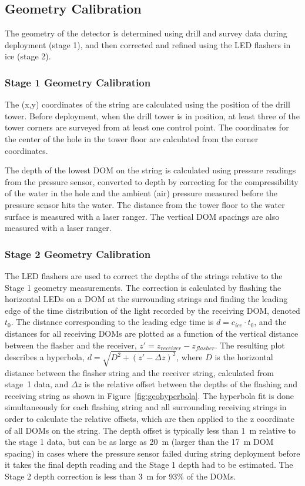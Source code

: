 \subsection{Geometry Calibration}

The geometry of the detector is determined using drill and survey data
during deployment (stage 1), and then corrected and refined using the LED
flashers in ice (stage 2).
\subsubsection{Stage 1 Geometry Calibration}
The (x,y) coordinates of the string are calculated using the position
of the drill tower. Before deployment, when the drill tower is in position, at least three
of the tower corners are surveyed from at least one control point.
The coordinates for the center of the hole in the tower floor are
calculated from the corner coordinates. 

The depth of the lowest DOM on the string is calculated using pressure
readings from the pressure sensor, converted to depth by correcting
for the compressibility of the water in the hole and the ambient (air)
pressure measured before the pressure sensor hits the water. The
distance from the tower floor to the water surface is measured with a
laser ranger. The vertical DOM spacings are also measured with a laser
ranger.

\subsubsection{Stage 2 Geometry Calibration}

The LED flashers are used to correct the depths of the
strings relative to the Stage 1 geometry measurements. The correction is
calculated by flashing the horizontal LEDs on a DOM at the surrounding strings and finding the leading edge of the time distribution of the
light recorded by the
receiving DOM, denoted $t_0$. The distance corresponding to the
leading edge time is $d = c_{ice} \cdot t_0$, and the distances for
all receiving DOMs are plotted as a function of the vertical distance
between the flasher and the receiver, $z' = z_{receiver} -
z_{flasher}$. The resulting plot describes a hyperbola, $d = \sqrt{D^2
+ (z' -\Delta z)^2}$, where $D$ is the horizontal distance between the
flasher string and the receiver string, calculated from stage~1 data,
and $\Delta z$ is the relative offset between the depths of the
flashing and receiving string as shown in Figure~\ref{fig:geohyperbola}. The hyperbola fit is done
simultaneously for each flashing string and all surrounding receiving
strings in order to calculate the relative offsets, which are then
applied to the z coordinate of all DOMs on the string. The depth offset is typically less than 1~m relative to the
stage 1 data, but can be as large as 20~m (larger than the 17~m DOM
spacing) in cases where the pressure sensor failed during string
deployment before it takes the final depth reading and the Stage 1 depth had to be estimated. The Stage 2 depth correction is less than 3~m for 93\% of the DOMs.

